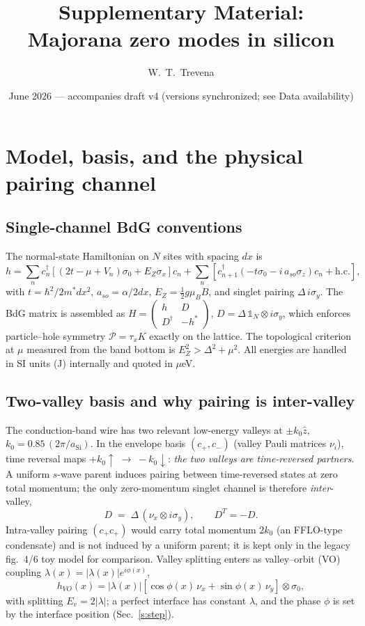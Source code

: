 \documentclass[11pt]{article}
\title{Supplementary Material:\\ Majorana zero modes in silicon}
\author{W.~T.~Trevena}
\date{June 2026 --- accompanies draft v4 (versions synchronized; see Data availability)}
\newcommand{\nx}{\nu_x}\newcommand{\ny}{\nu_y}\newcommand{\nz}{\nu_z}
\begin{document}
\maketitle
\tableofcontents

\section{Model, basis, and the physical pairing channel}\label{s:model}
\subsection{Single-channel BdG conventions}
The normal-state Hamiltonian on $N$ sites with spacing $dx$ is
\begin{equation}
h = \sum_n c_n^\dagger\!\left[(2t-\mu+V_n)\sigma_0 + E_Z\sigma_x\right]\!c_n
+ \sum_n \left[c_{n+1}^\dagger\!\left(-t\sigma_0 - i\,a_{so}\sigma_z\right)\!c_n
+ \mathrm{h.c.}\right],
\end{equation}
with $t=\hbar^2/2m^* dx^2$, $a_{so}=\alpha/2dx$, $E_Z=\tfrac12 g\mu_B B$, and
singlet pairing $\Delta\, i\sigma_y$. The BdG matrix is assembled as
$H=\begin{pmatrix} h & D\\ D^\dagger & -h^*\end{pmatrix}$,
$D = \Delta\,\mathbb{1}_N\otimes i\sigma_y$, which enforces particle--hole
symmetry $\mathcal{P}=\tau_x K$ exactly on the lattice. The topological
criterion at $\mu$ measured from the band bottom is
$E_Z^2 > \Delta^2 + \mu^2$. All energies are handled in SI units (J)
internally and quoted in $\mu$eV.

\subsection{Two-valley basis and why pairing is inter-valley}\label{s:ivpair}
The conduction-band wire has two relevant low-energy valleys at
$\pm k_0\hat z$, $k_0 = 0.85\,(2\pi/a_{\mathrm{Si}})$. In the envelope basis
$(c_{+},c_{-})$ (valley Pauli matrices $\nu_i$), time reversal maps
$+k_0\!\uparrow\;\to\;-k_0\!\downarrow$: \emph{the two valleys are
time-reversed partners}. A uniform $s$-wave parent induces pairing between
time-reversed states at zero total momentum; the only zero-momentum singlet
channel is therefore \emph{inter}-valley,
\begin{equation}
D \;=\; \Delta\,(\nx \otimes i\sigma_y), \qquad D^T = -D .
\label{eq:Div}
\end{equation}
Intra-valley pairing $(c_+ c_+)$ would carry total momentum $2k_0$
(an FFLO-type condensate) and is not induced by a uniform parent; it is kept
only in the legacy fig.~4/6 toy model for comparison. Valley splitting
enters as valley--orbit (VO) coupling
$\lambda(x) = |\lambda(x)|e^{i\phi(x)}$,
\begin{equation}
h_{VO}(x) = |\lambda(x)|\left[\cos\phi(x)\,\nx + \sin\phi(x)\,\ny\right]
\otimes \sigma_0 ,
\end{equation}
with splitting $E_v = 2|\lambda|$; a perfect interface has constant
$\lambda$, and the phase $\phi$ is set by the interface position
(Sec.~\ref{s:step}).
\end{document}
